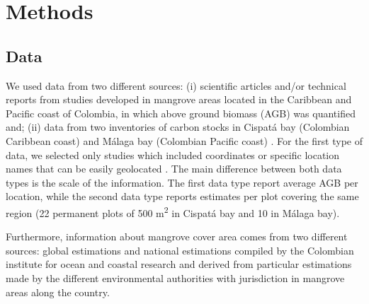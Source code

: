 \documentclass[review, authoryear]{elsarticle}   	%
\begin{document}
\section{Methods}
\subsection{Data}
We used data from two different sources: (i) scientific articles and/or technical reports from studies developed in mangrove areas located in the Caribbean and Pacific coast of Colombia, in which above ground biomass (AGB) was quantified and; (ii) data from two inventories of carbon stocks in Cispat\'{a} bay (Colombian Caribbean coast) and M\'{a}laga bay (Colombian Pacific coast) \citep{Bolivar_inpreparation, Malaga2015}. For the first type of data, we selected only studies which included coordinates or specific location names that can be easily geolocated \citep{INVEMAR2007, Lema2007, DelaPena2010, Blanco2012}. The main difference between both data types is the scale of the information. The first data type report average AGB per location, while the second data type reports estimates per plot covering the same region  (22 permanent plots of 500 m\textsuperscript2 in Cispat\'{a} bay  and 10 in M\'{a}laga bay). 


%
Furthermore, information about mangrove cover area comes from two different sources: global estimations \citep{FAO2007, Giri2010, Giri2013, CONL:CONL12060} and national estimations compiled by the Colombian institute for ocean and coastal research \citep{INVEMAR2014} and derived from particular estimations made by the different environmental authorities with jurisdiction in mangrove areas along the country. 
\end{document}
